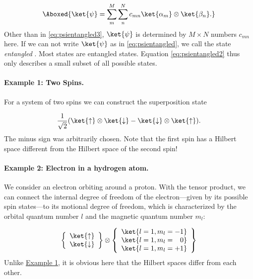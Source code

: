 \begin{align}
				\Aboxed{\ket{\psi}=\sum_m^M \sum_n^N c_{mn}\ket{\alpha_m}\otimes \ket{\beta_n}.}
			
\end{align}
						Other than in \eqref{eq:psientangled3}, $\ket{\psi}$ is determined by $M \times N$ numbers $c_{mn}$ here. If we can not write $\ket{\psi}$ as in \eqref{eq:psientangled}, we call the state \emph{entangled} . Most states are entangled states. Equation \eqref{eq:psientangled2} thus only describes a small subset of all possible states.

\paragraph{Example 1: Two Spins.}\label{sec:examplespin}  For a system of two spins we can construct the superposition state

\begin{align}
						\frac{1}{\sqrt{2}}(\ket{\uparrow}\otimes\ket{\downarrow}-\ket{\downarrow}\otimes\ket{\uparrow}).
					
\end{align}
					The minus sign was arbitrarily chosen.
					Note that the first spin has a Hilbert space different from the Hilbert space of the second spin!
				\paragraph{Example 2: Electron in a hydrogen atom.} We consider an electron orbiting around a proton. With the tensor product, we can connect the internal degree of freedom of the electron---given by its possible spin states---to its motional degree of freedom, which is characterized by the orbital quantum number $l$ and the magnetic quantum number $m_l$:

\begin{align}
						\left\{

\begin{array}
{c} \ket{\uparrow} \\ \ket{\downarrow} \end{array}
 \right\} \otimes \left\{

\begin{array}
{c} \ket{l=1,m_l=-1} \\ \ket{l=1,m_l=\enspace \; 0} \\ \ket{l=1,m_l=+1}  \end{array}
 \right\}
					
\end{align}
										Unlike \hyperref[sec:examplespin]{Example 1}, it is obvious here that the Hilbert spaces differ from each other.

